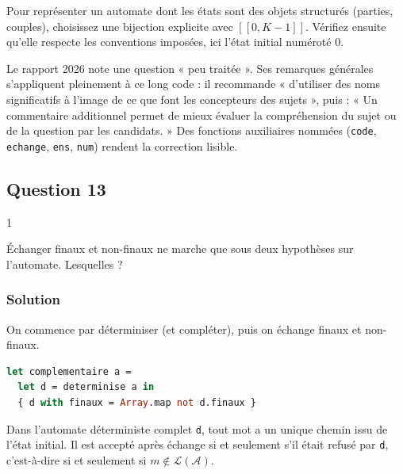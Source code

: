 \documentclass[11pt,a4paper]{article}
\begin{document}
\begin{methode}

Pour représenter un automate dont les états sont des objets structurés (parties, couples), choisissez une bijection explicite avec \([\![0,K-1]\!]\). Vérifiez ensuite qu'elle respecte les conventions imposées, ici l'état initial numéroté 0.

\end{methode}

\begin{jury}

Le rapport 2026 note une question « peu traitée ». Ses remarques générales s'appliquent pleinement à ce long code : il recommande « d'utiliser des noms significatifs à l'image de ce que font les concepteurs des sujets », puis : « Un commentaire additionnel permet de mieux évaluer la compréhension du sujet ou de la question par les candidats. » Des fonctions auxiliaires nommées (\texttt{code}, \texttt{echange}, \texttt{ens}, \texttt{num}) rendent la correction lisible.

\end{jury}

\hypertarget{question-13}{%
\subsection{Question 13}\label{question-13}}

\begin{indication}{1}

Échanger finaux et non-finaux ne marche que sous deux hypothèses sur l'automate. Lesquelles ?

\end{indication}

\hypertarget{solution-12}{%
\subsubsection{Solution}\label{solution-12}}

On commence par déterminiser (et compléter), puis on échange finaux et non-finaux.

\begin{lstlisting}[language=Caml]
let complementaire a =
  let d = determinise a in
  { d with finaux = Array.map not d.finaux }
\end{lstlisting}

Dans l'automate déterministe complet \texttt{d}, tout mot a un unique chemin issu de l'état initial. Il est accepté après échange si et seulement s'il était refusé par \texttt{d}, c'est-à-dire si et seulement si \(m\notin\mathcal{L}(\mathcal{A})\).
\end{document}
